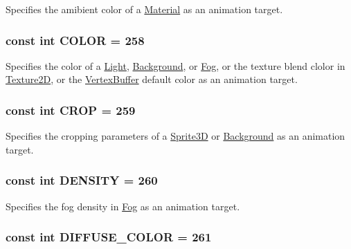 Specifies the amibient color of a \hyperlink{classm3g_1_1Material}{Material} as an animation target. \hypertarget{classm3g_1_1AnimationTrack_a6d8034c897057de595a4511a4e7a837}{
\subsubsection[{COLOR}]{\setlength{\rightskip}{0pt plus 5cm}const int {\bf COLOR} = 258}}
\label{classm3g_1_1AnimationTrack_a6d8034c897057de595a4511a4e7a837}


Specifies the color of a \hyperlink{classm3g_1_1Light}{Light}, \hyperlink{classm3g_1_1Background}{Background}, or \hyperlink{classm3g_1_1Fog}{Fog}, or the texture blend clolor in \hyperlink{classm3g_1_1Texture2D}{Texture2D}, or the \hyperlink{classm3g_1_1VertexBuffer}{VertexBuffer} default color as an animation target. \hypertarget{classm3g_1_1AnimationTrack_91fa562078e577c24d06faf8391b34fe}{
\subsubsection[{CROP}]{\setlength{\rightskip}{0pt plus 5cm}const int {\bf CROP} = 259}}
\label{classm3g_1_1AnimationTrack_91fa562078e577c24d06faf8391b34fe}


Specifies the cropping parameters of a \hyperlink{classm3g_1_1Sprite3D}{Sprite3D} or \hyperlink{classm3g_1_1Background}{Background} as an animation target. \hypertarget{classm3g_1_1AnimationTrack_7d0fe4463930d4a4b24fc47660561899}{
\subsubsection[{DENSITY}]{\setlength{\rightskip}{0pt plus 5cm}const int {\bf DENSITY} = 260}}
\label{classm3g_1_1AnimationTrack_7d0fe4463930d4a4b24fc47660561899}


Specifies the fog density in \hyperlink{classm3g_1_1Fog}{Fog} as an animation target. \hypertarget{classm3g_1_1AnimationTrack_9631242a611cf95d697c25064dba7c4f}{
\subsubsection[{DIFFUSE\_\-COLOR}]{\setlength{\rightskip}{0pt plus 5cm}const int {\bf DIFFUSE\_\-COLOR} = 261}}
\label{classm3g_1_1AnimationTrack_9631242a611cf95d697c25064dba7c4f}


